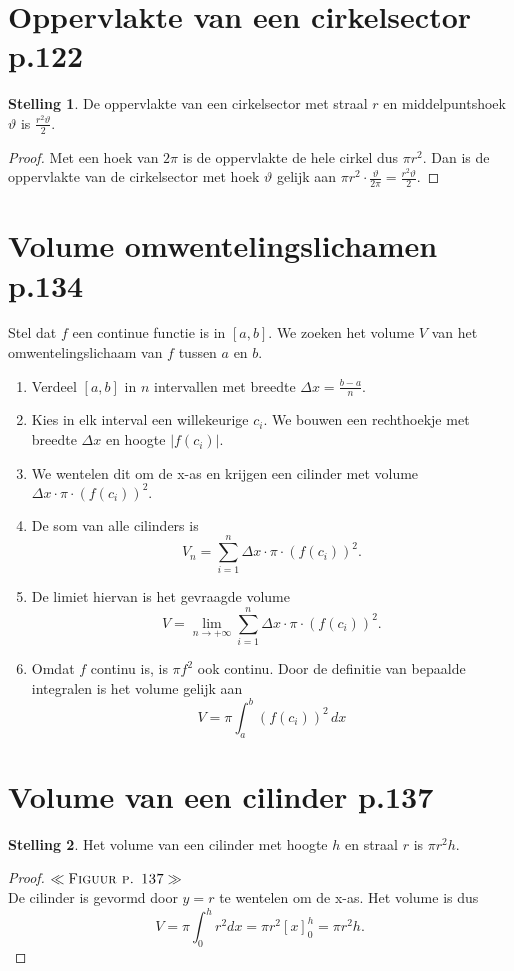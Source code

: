 \documentclass{article}
\theoremstyle{definition}
\newtheorem*{Stelling}{Stelling}
\begin{document}
\section{Oppervlakte van een cirkelsector p.122}
\begin{Stelling}
    De oppervlakte van een cirkelsector met straal $r$ en middelpuntshoek $\vartheta$ is $\frac{r^2\vartheta}{2}.$
\end{Stelling}
\begin{proof}
    Met een hoek van $2\pi$ is de oppervlakte de hele cirkel dus $\pi r^2$. Dan is de oppervlakte van de cirkelsector met hoek $\vartheta$ gelijk aan $\pi r^2\cdot\frac{\vartheta}{2\pi} = \frac{r^2\vartheta}{2}.$
\end{proof}
\section{Volume omwentelingslichamen p.134}
Stel dat $f$ een continue functie is in $\left[a,b\right]$. We zoeken het volume $V$ van het omwentelingslichaam van $f$ tussen $a$ en $b$.
\begin{enumerate}
    \item Verdeel $\left[a,b\right]$ in $n$ intervallen met breedte $\Delta x = \frac{b-a}{n}.$
    \item Kies in elk interval een willekeurige $c_i$. We bouwen een rechthoekje met breedte $\Delta x$ en hoogte $\left|f\left(c_i\right)\right|$.
    \item We wentelen dit om de x-as en krijgen een cilinder met volume\\ $\Delta x \cdot \pi \cdot\left(f\left(c_i\right)\right)^2.$
    \item De som van alle cilinders is $$V_n = \sum_{i=1}^n\Delta x \cdot \pi \cdot\left(f\left(c_i\right)\right)^2.$$
    \item De limiet hiervan is het gevraagde volume $$V = \lim_{n\to +\infty} \sum_{i=1}^n\Delta x \cdot \pi \cdot\left(f\left(c_i\right)\right)^2.$$
    \item Omdat $f$ continu is, is $\pi f^2$ ook continu. Door de definitie van bepaalde integralen is het volume gelijk aan $$V=\pi\int_a^b\left(f\left(c_i\right)\right)^2\, dx$$
\end{enumerate}
\section{Volume van een cilinder p.137}
\begin{Stelling}
    Het volume van een cilinder met hoogte $h$ en straal $r$ is $\pi r^2h.$
\end{Stelling}
\begin{proof}
   $\ll\textsc{Figuur p. 137}\gg$\\ De cilinder is gevormd door $y=r$ te wentelen om de x-as. Het volume is dus $$V = \pi\int_0^h r^2 dx= \pi r^2 \left[x\right]_0^h = \pi r^2h.$$
\end{proof}
\end{document}
